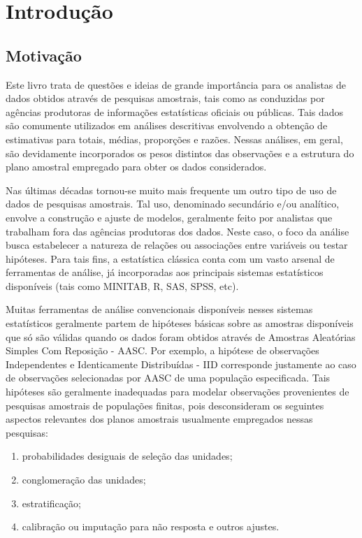 \documentclass[
  12pt,
  brazilian,
]{book}
\theoremstyle{definition}
\theoremstyle{definition}
\theoremstyle{definition}
\theoremstyle{definition}
\theoremstyle{remark}
\begin{document}
\hypertarget{introduc}{%
\chapter{Introdução}\label{introduc}}

\hypertarget{motivauxe7uxe3o}{%
\section{Motivação}\label{motivauxe7uxe3o}}

Este livro trata de questões e ideias de grande importância para os analistas de dados obtidos através de pesquisas amostrais, tais como as conduzidas por agências produtoras de informações estatísticas oficiais ou públicas. Tais dados são comumente utilizados em análises descritivas envolvendo a obtenção de estimativas para totais, médias, proporções e razões. Nessas análises, em geral, são devidamente incorporados os pesos distintos das observações e a estrutura do plano amostral empregado para obter os dados considerados.

Nas últimas décadas tornou-se muito mais frequente um outro tipo de uso de dados de pesquisas amostrais. Tal uso, denominado secundário e/ou analítico, envolve a construção e ajuste de modelos, geralmente feito por analistas que trabalham fora das agências produtoras dos dados. Neste caso, o foco da análise busca estabelecer a natureza de relações ou associações entre variáveis ou testar hipóteses. Para tais fins, a estatística clássica conta com um vasto arsenal de ferramentas de análise, já incorporadas aos principais sistemas estatísticos disponíveis (tais como MINITAB, R, SAS, SPSS, etc).

Muitas ferramentas de análise convencionais disponíveis nesses sistemas estatísticos geralmente partem de hipóteses básicas sobre as amostras disponíveis que só são válidas quando os dados foram obtidos através de Amostras Aleatórias Simples Com Reposição - AASC. Por exemplo, a hipótese de observações Independentes e Identicamente Distribuídas - IID corresponde justamente ao caso de observações selecionadas por AASC de uma população especificada. Tais hipóteses são geralmente inadequadas para modelar observações provenientes de pesquisas amostrais de populações finitas, pois desconsideram os seguintes aspectos relevantes dos planos amostrais usualmente empregados nessas pesquisas:

\begin{enumerate}
\def\labelenumi{\roman{enumi}.}
\item
  probabilidades desiguais de seleção das unidades;
\item
  conglomeração das unidades;
\item
  estratificação;
\item
  calibração ou imputação para não resposta e outros ajustes.
\end{enumerate}
\end{document}
